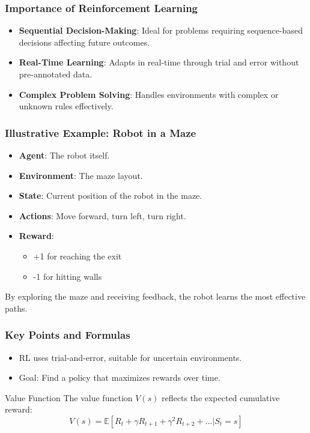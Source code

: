 \documentclass{beamer}
\begin{document}
\begin{frame}[fragile]
    \frametitle{Importance of Reinforcement Learning}
    
    \begin{itemize}
        \item \textbf{Sequential Decision-Making}: Ideal for problems requiring sequence-based decisions affecting future outcomes.
        \item \textbf{Real-Time Learning}: Adapts in real-time through trial and error without pre-annotated data.
        \item \textbf{Complex Problem Solving}: Handles environments with complex or unknown rules effectively.
    \end{itemize}
\end{frame}

\begin{frame}[fragile]
    \frametitle{Illustrative Example: Robot in a Maze}
    
    \begin{itemize}
        \item \textbf{Agent}: The robot itself.
        \item \textbf{Environment}: The maze layout.
        \item \textbf{State}: Current position of the robot in the maze.
        \item \textbf{Actions}: Move forward, turn left, turn right.
        \item \textbf{Reward}: 
        \begin{itemize}
            \item +1 for reaching the exit
            \item -1 for hitting walls
        \end{itemize}
    \end{itemize}
    
    By exploring the maze and receiving feedback, the robot learns the most effective paths.
\end{frame}

\begin{frame}[fragile]
    \frametitle{Key Points and Formulas}
    
    \begin{itemize}
        \item RL uses trial-and-error, suitable for uncertain environments.
        \item Goal: Find a policy that maximizes rewards over time.
    \end{itemize}
    
    \begin{block}{Value Function}
        The value function \( V(s) \) reflects the expected cumulative reward:
        \begin{equation}
            V(s) = \mathbb{E}[R_t + \gamma R_{t+1} + \gamma^2 R_{t+2} + \ldots | S_t = s]
        \end{equation}
    \end{block}
\end{frame}
\end{document}
